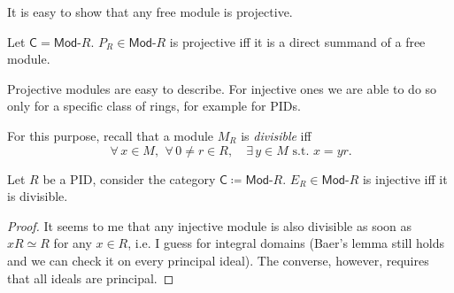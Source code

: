 \begin{rem}
	It is easy to show that any free module is projective.
\end{rem}

\begin{prop}
	Let $\mathsf{C} = \mathsf{Mod}\text{-}R$.
	$P_R \in \mathsf{Mod}\text{-}R$ is projective iff 
	it is a direct summand of a free module.
\end{prop} 

\begin{rem}
	Projective modules are easy to describe.
	For injective ones we are able to do so only for a specific class of rings, for example for PIDs.

	For this purpose, recall that a module $M_R$ is {\em divisible} iff
	\begin{equation}
	\,\forall\, x \in M, \ \,\forall\, 0 \neq r \in R, \quad \exists\, y \in M \text{ s.t. } x = yr
	.\end{equation} 
\end{rem}

\begin{prop}
	Let $R$ be a PID, consider the category $\mathsf{C} \coloneqq \mathsf{Mod}\text{-}R$.
	$E_R \in \mathsf{Mod}\text{-}R$ is injective iff it is divisible.
\end{prop} 
\begin{proof}
	It seems to me that any injective module is also divisible
	as soon as $xR \simeq R$ for any $x \in R$, i.e. I guess for integral domains
	(Baer's lemma still holds and we can check it on every principal ideal).
	The converse, however, requires that all ideals are principal.
\end{proof}

